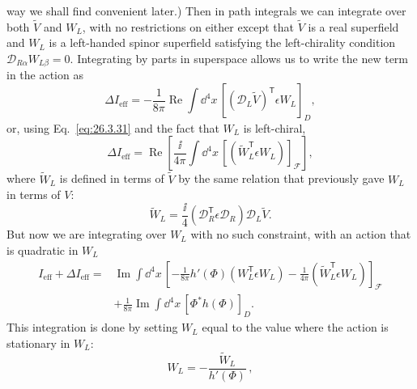 way we shall find convenient later.) Then in path integrals we can integrate
over both \(\widetilde V\) and \(W_L\), with no restrictions on either except
that \(\widetilde V\) is a real superfield and \(W_L\) is a left-handed
spinor superfield satisfying the left-chirality condition
\(\mathcal{D}_{R\alpha}W_{L\beta}=0\). Integrating by parts in superspace
allows us to write the new term in the action as
\begin{equation}
  \Delta I_{\mathrm{eff}}
  =-\frac{1}{8\pi}\operatorname{Re}\int \dd^4x\,
    \left[
      \left(\mathcal{D}_L\widetilde V\right)^{\mathsf T}
      \epsilon W_L
    \right]_D,
  \tag{29.5.26}\label{eq:29.5.26}
\end{equation}
or, using Eq.~\eqref{eq:26.3.31} and the fact that \(W_L\) is left-chiral,
\begin{equation}
  \Delta I_{\mathrm{eff}}
  =\operatorname{Re}\left[
    \frac{\ii}{4\pi}\int \dd^4x\,
    \left[
      \left(\widetilde W_L^{\mathsf T}\epsilon W_L\right)
    \right]_{\mathcal F}
  \right],
  \tag{29.5.27}\label{eq:29.5.27}
\end{equation}
where \(\widetilde W_L\) is defined in terms of \(\widetilde V\) by the same
relation that previously gave \(W_L\) in terms of \(V\):
\begin{equation}
  \widetilde W_L
  =\frac{\ii}{4}
    \left(\mathcal{D}_R^{\mathsf T}\epsilon\mathcal{D}_R\right)
    \mathcal{D}_L\widetilde V.
  \tag{29.5.28}\label{eq:29.5.28}
\end{equation}
But now we are integrating over \(W_L\) with no such constraint, with an
action that is quadratic in \(W_L\)
\begin{equation}
  \begin{aligned}
  I_{\mathrm{eff}}+\Delta I_{\mathrm{eff}}
  ={}&\operatorname{Im}\int \dd^4x\,
  \left[
    -\frac{1}{8\pi}h'(\Phi)
      \left(W_L^{\mathsf T}\epsilon W_L\right)
    -\frac{1}{4\pi}
      \left(\widetilde W_L^{\mathsf T}\epsilon W_L\right)
  \right]_{\mathcal F}
  \\
  &+\frac{1}{8\pi}\operatorname{Im}\int \dd^4x\,
    \left[\Phi^*h(\Phi)\right]_D.
  \end{aligned}
  \tag{29.5.29}\label{eq:29.5.29}
\end{equation}
This integration is done by setting \(W_L\) equal to the value where the
action is stationary in \(W_L\):
\begin{equation}
  W_L=-\frac{\widetilde W_L}{h'(\Phi)}\,,
  \tag{29.5.30}\label{eq:29.5.30}
\end{equation}
